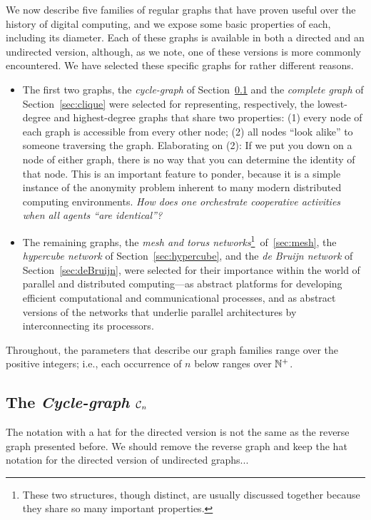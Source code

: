 We now describe five families of regular graphs that have proven
useful over the history of digital computing, and we expose some basic
properties of each, including its diameter.  Each of these graphs is
available in both a directed and an undirected version, although, as
we note, one of these versions is more commonly encountered.  We have
selected these specific graphs for rather different reasons.
\begin{itemize}
\item
The first two graphs, the {\it cycle-graph} of Section~\ref{sec:cycle}
and the {\it complete graph} of Section~\ref{sec:clique} were selected
for representing, respectively, the lowest-degree and highest-degree
graphs that share two properties: (1) every node of each graph is
accessible from every other node; (2) all nodes ``look alike'' to
someone traversing the graph.  Elaborating on (2): If we put you down
on a node of either graph, there is no way that you can determine the
identity of that node.  This is an important feature to ponder,
because it is a simple instance of the anonymity problem inherent to
many modern distributed computing environments.  {\it How does one
  orchestrate cooperative activities when all agents ``are
  identical''?}
\item
The remaining graphs, the {\it mesh and torus networks}\footnote{These
  two structures, though distinct, are usually discussed together
  because they share so many important properties.}~of~\ref{sec:mesh},
the {\it hypercube network} of Section~\ref{sec:hypercube}, and the
{\it de Bruijn network} of Section~\ref{sec:deBruijn}, were selected
for their importance within the world of parallel and distributed
computing---as abstract platforms for developing efficient
computational and communicational processes, and as abstract versions
of the networks that underlie parallel architectures by
interconnecting its processors.
\end{itemize}
Throughout, the parameters that describe our graph families range over
the positive integers; i.e., each occurrence of $n$ below ranges over
$\mathbb{N}^+$.

\subsection{The {\it Cycle-graph} $\mbox{$\cal C$}_n$}
\label{sec:cycle}

{\Denis The notation with a hat for the directed version is not the same as
the reverse graph presented before.
We should remove the reverse graph and keep the hat notation for the directed version of 
undirected graphs...}


